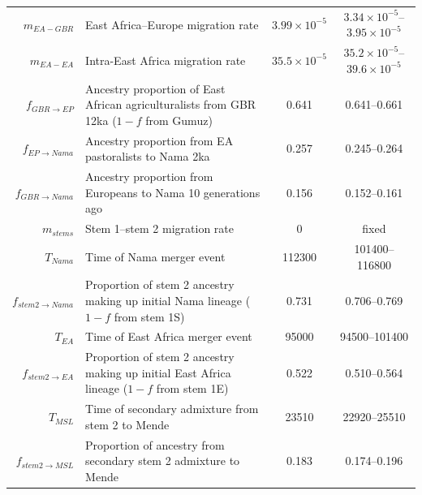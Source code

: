 \documentclass[]{article}
\begin{document}
\begin{table}[ht]
\begin{tabular}[t]{rP{8cm}cc}
    $m_{EA-GBR}$ & East Africa--Europe migration rate & $3.99\times10^{-5}$ & $3.34\times10^{-5}$--$3.95\times10^{-5}$ \\
    $m_{EA-EA}$ & Intra-East Africa migration rate & $35.5\times10^{-5}$ & $35.2\times10^{-5}$--$39.6\times10^{-5}$ \\
    $f_{GBR \rightarrow EP}$ & Ancestry proportion of East African agriculturalists from GBR 12ka ($1-f$ from Gumuz) & 0.641 & 0.641--0.661 \\
    $f_{EP \rightarrow Nama}$ & Ancestry proportion from EA pastoralists to Nama 2ka & 0.257 & 0.245--0.264 \\
    $f_{GBR \rightarrow Nama}$ & Ancestry proportion from Europeans to Nama 10 generations ago & 0.156 & 0.152--0.161 \\
    $m_{stems}$ & Stem 1--stem 2 migration rate & $0$ & fixed \\
    $T_{Nama}$ & Time of Nama merger event & 112300 & 101400--116800 \\
    $f_{stem 2 \rightarrow Nama}$ & Proportion of stem 2 ancestry making up initial Nama lineage ($1-f$ from stem 1S) & 0.731 & 0.706--0.769 \\
    $T_{EA}$ & Time of East Africa merger event & 95000 & 94500--101400 \\
    $f_{stem 2 \rightarrow EA}$ & Proportion of stem 2 ancestry making up initial East Africa lineage ($1-f$ from stem 1E) & 0.522 & 0.510--0.564 \\
    $T_{MSL}$ & Time of secondary admixture from stem 2 to Mende & 23510 & 22920--25510 \\
    $f_{stem 2 \rightarrow MSL}$ & Proportion of ancestry from secondary stem 2 admixture to Mende & 0.183 & 0.174--0.196 \\
    \bottomrule
\end{tabular}
\end{table}
\end{document}

